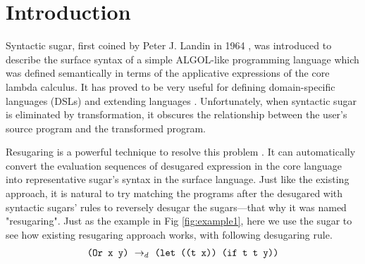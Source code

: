 \section{Introduction}









Syntactic sugar, first coined by Peter J. Landin in 1964 \cite{syntacticsugar}, was introduced to describe the surface syntax of a simple ALGOL-like programming language which was defined semantically in terms of the applicative expressions of the core lambda calculus. It has proved to be very useful for defining domain-specific languages (DSLs) and extending languages \cite{FellFFKBMT18,CulpFFK19}.
Unfortunately, when syntactic sugar is eliminated by transformation, it obscures the relationship between the user’s source program and the transformed program.



Resugaring is a powerful technique to resolve this problem \cite{resugaring,hygienic}. It  can automatically convert the evaluation sequences of desugared expression in the core language into representative sugar's syntax in the surface language. Just like the existing approach, it is natural to try matching the programs after the desugared with syntactic sugars' rules to reversely desugar the sugars---that why it was named "resugaring". Just as the example in Fig \ref{fig:example1}, here we use the sugar  to see how existing resugaring approach works, with following desugaring rule.
\[
\begin{array}{l}
\texttt{(Or x y)} ~\rightarrow_d~ \texttt{(let ((t x)) (if t t y))}\\
\end{array}
\]


